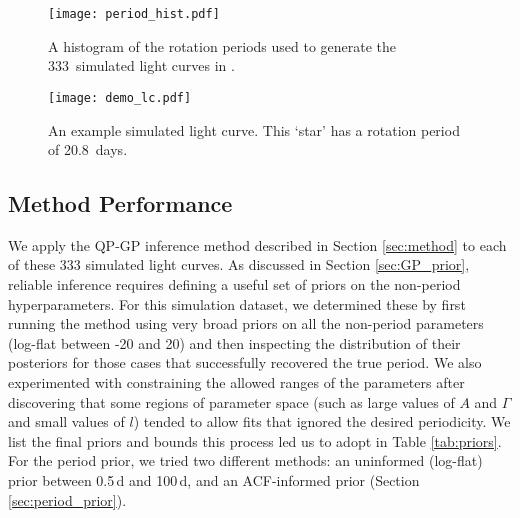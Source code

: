 \documentclass[a4paper,fleqn,usenatbib,useAMS]{mnras}
\newcommand{\naigrain}{333}
\newcommand{\aigrainexampleperiod}{20.8}
\newcommand{\vrcomment}[1]{{\color{magenta}#1}}
\begin{document}
\begin{figure}
\begin{center}
\texttt{[image: period\_hist.pdf]}
\caption{A histogram of the rotation periods used to generate the \naigrain\
simulated light curves in \citet{Aigrain2015}.}
\label{fig:period_hist}
\end{center}
\end{figure}

\begin{figure}
\begin{center}
\texttt{[image: demo\_lc.pdf]}
\caption[A simulated light curve.]
{An example simulated light curve. This `star' has a rotation period of
\aigrainexampleperiod\ days.}
\label{fig:demo_lc}
\end{center}
\end{figure}


\subsection{Method Performance}
\label{sec:performance}

We apply the QP-GP inference method described in Section \ref{sec:method}
to each of these 333 simulated light curves.  As discussed in Section
\ref{sec:GP_prior}, reliable inference
requires defining a useful set of priors on the non-period
hyperparameters.
For this simulation dataset, we determined these by first running
the method using very broad priors on all the non-period parameters
(log-flat between -20 and 20)
and then inspecting the distribution of their posteriors for those cases
that successfully recovered the true period.
We also experimented with constraining the allowed ranges of the parameters
after discovering that some regions of parameter space (such as large values
of $A$ and $\Gamma$ and small values of $l$) tended to allow fits that ignored
the desired periodicity.
We list the final priors and bounds this process led us to adopt
in Table \ref{tab:priors}.
For the period prior, we tried two different methods: an uninformed (log-flat)
prior between 0.5\,d and 100\,d, and an ACF-informed prior
(Section \ref{sec:period_prior}).
\end{document}
